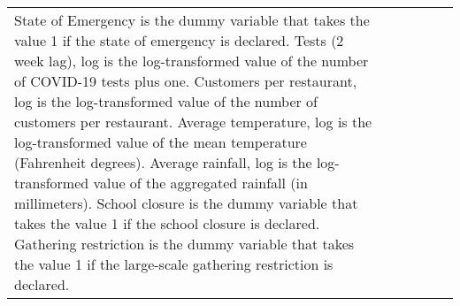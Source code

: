 \begin{table}[!htbp]
\begin{tabular}{@{\extracolsep{1pt}}lccccc}
{{State of Emergency is the dummy variable that takes the value 1 if the state of emergency is declared. 
Tests (2 week lag), log is the log-transformed value of the number of COVID-19 tests plus one.
Customers per restaurant, log is the log-transformed value of the number of customers per restaurant.
Average temperature, log is the log-transformed value of the mean temperature (Fahrenheit degrees).
Average rainfall, log is the log-transformed value of the aggregated rainfall (in millimeters).
School closure is the dummy variable that takes the value 1 if the school closure is declared. 
Gathering restriction is the dummy variable that takes the value 1 if the large-scale gathering restriction is declared.}} \\
\end{tabular} 
\end{table} 

